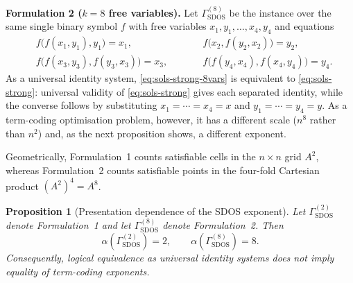 \documentclass[11pt]{article}
\theoremstyle{plain}
\newtheorem{proposition}[theorem]{Proposition}
\theoremstyle{definition}
\theoremstyle{definition}
\theoremstyle{remark}
\newcommand{\A}{A}
\begin{document}
\smallskip
\noindent\textbf{Formulation 2 ($k=8$ free variables).}
Let $\Gamma_{\mathrm{SDOS}}^{(8)}$ be the instance over the same single binary symbol $f$ with free variables
\(x_1,y_1,\dots,x_4,y_4\) and equations
\begin{equation}
\label{eq:sols-strong-8vars}
\begin{aligned}
& f\bigl(f(x_1,y_1),y_1\bigr)=x_1, \qquad
&& f\bigl(x_2,f(y_2,x_2)\bigr)=y_2,\\[-2pt]
& f\bigl(f(x_3,y_3),f(y_3,x_3)\bigr)=x_3,\qquad
&& f\bigl(f(y_4,x_4),f(x_4,y_4)\bigr)=y_4.
\end{aligned}
\end{equation}
As a universal identity system, \eqref{eq:sols-strong-8vars} is equivalent to \eqref{eq:sols-strong}:
universal validity of \eqref{eq:sols-strong} gives each separated identity, while the converse follows by
substituting $x_1=\cdots=x_4=x$ and $y_1=\cdots=y_4=y$.
As a term-coding optimisation problem, however, it has a different scale ($n^8$ rather than $n^2$) and, as the next
proposition shows, a different exponent.

Geometrically, Formulation~1 counts satisfiable cells in the $n\times n$ grid $\A^2$, whereas Formulation~2 counts
satisfiable points in the four-fold Cartesian product $(\A^2)^4=\A^8$.

\begin{proposition}[Presentation dependence of the SDOS exponent]
\label{prop:sdos-exponents}
Let $\Gamma_{\mathrm{SDOS}}^{(2)}$ denote Formulation~1 and let
$\Gamma_{\mathrm{SDOS}}^{(8)}$ denote Formulation~2.  Then
\[
  \alpha(\Gamma_{\mathrm{SDOS}}^{(2)})=2,
  \qquad
  \alpha(\Gamma_{\mathrm{SDOS}}^{(8)})=8.
\]
Consequently, logical equivalence as universal identity systems does not imply equality of term-coding exponents.
\end{proposition}
\end{document}
